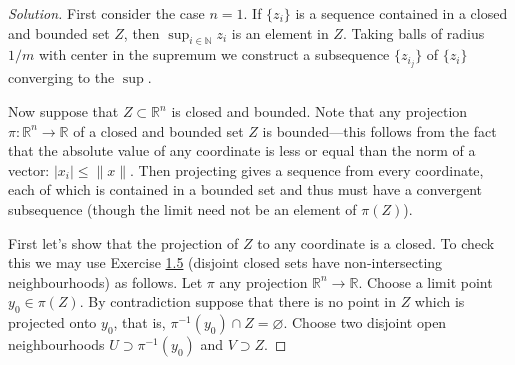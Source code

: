 \begin{proof}[Solution]\leavevmode
	First consider the case $n=1$. If  $\{z_i\}$ is a sequence contained in a closed and bounded set $Z$, then  $\operatorname{sup}_{i \in \mathbb{N}}z_i$ is an element in $Z$. Taking balls of radius $1/m$ with center in the supremum we construct a subsequence \(\{z_{i_j}\}\) of  $\{z_i\}$ converging to the $\operatorname{sup}$.

	Now suppose that $Z \subset\mathbb{R}^n$ is closed and bounded. Note that any projection \(\pi:\mathbb{R}^n\to \mathbb{R}\) of a closed and bounded set \(Z\) is bounded---this follows from the fact that the absolute value of any coordinate is less or equal than the norm of a vector: \(|x_i|\leq \|x\|\). Then projecting gives a sequence from every coordinate, each of which is contained in a bounded set and thus must have a convergent subsequence (though the limit need not be an element of \(\pi(Z)\)).
	\iffalse Projecting gives a sequence in every coordinate, {\color{2}each of which is contained in a closed and bounded set in \(\mathbb{R}\)}, so that they must have convergent subsequences.

	\begin{claim}\leavevmode
		Any projection \(\pi:\mathbb{R}^n\to \mathbb{R}\) of a closed and bounded set \(Z\) is closed and bounded.
	\end{claim}
	\begin{proof}[Proof of claim]\leavevmode
	Boundedness is immediate from the fact that the projection of a ball is a ball---this follows from the fact that the absolute value of any coordinate is less or equal than the norm of a vector: \(|x_i|\leq \|x\|\).

	For closedness choose a limit point \(y_0\) of \(\pi(Z)\). This gives a sequence \(\{z_i\} \subset Z\) such that \(\{\pi(z_i)\}\) converges to \(y_0\). By contradiction suppose that there is no \(z_0 \in Z\) such that \(\pi(z_0)=y_0\). Then all \(z \in Z\) are \textit{not} limit points of \(\{z_i\}\): \(\pi\) is continuous, so \(\pi(\lim_{i} z_i)=\lim_{i} \pi(z_i)=y_0\). {\color{2}But that's exactly what this exercise is about!!}
	\end{proof}\fi

\iffalse
First let's show that the projection of \(Z\) to any coordinate is a closed. To check this we may use Exercise \hyperref[exer:1.5]{1.5} (disjoint closed sets have non-intersecting neighbourhoods) as follows. Let \(\pi\) any projection \(\mathbb{R}^n \to \mathbb{R}\). Choose a limit point \(y_0 \in \pi(Z)\). By contradiction suppose that there is no point in \(Z\) which is projected onto \(y_0\), that is, \(\pi^{-1}(y_0) \cap Z=\varnothing\). Choose two disjoint open neighbourhoods \(U \supset \pi^{-1}(y_0)\) and \(V \supset Z\).


\end{proof}
